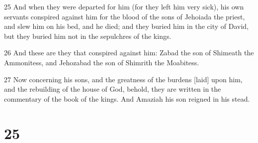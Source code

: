 \par 25 And when they were departed for him (for they left him very sick), his own servants conspired against him for the blood of the sons of Jehoiada the priest, and slew him on his bed, and he died; and they buried him in the city of David, but they buried him not in the sepulchres of the kings.
\par 26 And these are they that conspired against him: Zabad the son of Shimeath the Ammonitess, and Jehozabad the son of Shimrith the Moabitess.
\par 27 Now concerning his sons, and the greatness of the burdens [laid] upon him, and the rebuilding of the house of God, behold, they are written in the commentary of the book of the kings. And Amaziah his son reigned in his stead.

\chapter{25}

